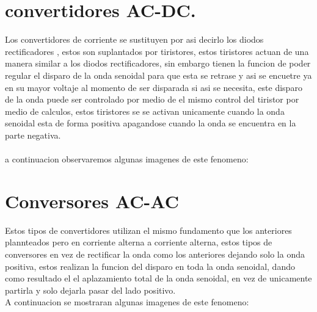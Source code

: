 \documentclass[12pt]{article}
\begin{document}
\maketitle
\section{convertidores AC-DC.}
 Los convertidores de corriente  se sustituyen por asi decirlo los diodos rectificadores , estos son suplantados por tiristores, estos tiristores actuan de una manera similar a los diodos rectificadores, sin embargo tienen la funcion de poder regular el disparo de la onda senoidal para que esta se retrase y asi se encuetre ya en su mayor voltaje al momento de ser disparada si asi se necesita, este disparo de la onda puede ser controlado por medio de el mismo control del tiristor por medio de calculos, estos tiristores se se activan unicamente cuando la  onda senoidal esta de forma positiva apagandose cuando la onda se encuentra en la parte negativa.\\\\
a continuacion observaremos algunas imagenes de este fenomeno:  


\maketitle
\section{Conversores AC-AC}
Estos  tipos de convertidores utilizan el mismo fundamento que los anteriores plannteados pero en corriente alterna a corriente alterna, estos tipos de conversores en vez de rectificar la onda como los anteriores  dejando solo la onda positiva, estos realizan la funcion del disparo en toda la onda senoidal, dando como  resultado el el aplazamiento total de la onda senoidal, en vez de unicamente partirla y solo dejarla pasar del lado positivo.\\
A continuacion se mostraran algunas imagenes de este fenomeno:\\



\maketitle
\end{document}
